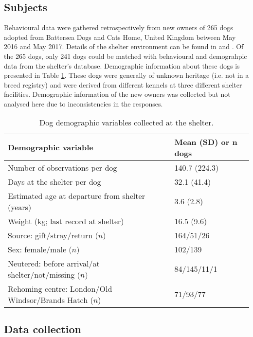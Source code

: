 \documentclass[12pt]{article}
\begin{document}
\subsection{Subjects}
Behavioural data were gathered retrospectively from new owners of 265 dogs adopted from Battersea Dogs and Cats Home, United Kingdom between May 2016 and May 2017. Details of the shelter environment can be found in \textcite{goold2017aggressiveness} and \textcite{goold2017modelling}. Of the 265 dogs, only 241 dogs could be matched with behavioural and demograhpic data from the shelter's database. Demographic information about these dogs is presented in Table \ref{table_demoshelter}. These dogs were generally of unknown heritage (i.e. not in a breed registry) and were derived from different kennels at three different shelter facilities. Demographic information of the new owners was collected but not analysed here due to inconsistencies in the responses.

\begin{table}
  \centering
  \begin{tabular}{ll}
  \textbf{Demographic variable} & \textbf{Mean (SD) or $\boldsymbol{n}$ dogs}\\ \hline
  Number of observations per dog & 140.7 (224.3) \\
  Days at the shelter per dog & 32.1 (41.4)\\
  Estimated age at departure from shelter (years) & 3.6 (2.8)\\
  Weight (kg; last record at shelter) & 16.5 (9.6)\\
  Source: gift/stray/return ($n$) & 164/51/26\\
  Sex: female/male ($n$) & 102/139\\
  Neutered: before arrival/at shelter/not/missing ($n$) & 84/145/11/1\\
  Rehoming centre: London/Old Windsor/Brands Hatch ($n$) & 71/93/77\\
  \hline
  \end{tabular}
  \caption{Dog demographic variables collected at the shelter.}
  \label{table_demoshelter}
\end{table}

\subsection{Data collection}
\end{document}
